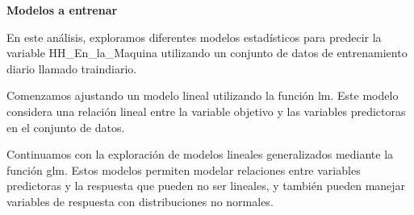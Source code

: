\documentclass[
  11pt,
  bookmarksnumbered]{article}
\begin{document}
\begin{table}[H]

\caption{\label{tab:unnamed-chunk-23}Base de Datos de prueba diario}
\centering
{}
\end{table}

\textbf{Modelos a entrenar}

En este análisis, exploramos diferentes modelos estadísticos para predecir la variable HH\_En\_la\_Maquina utilizando un conjunto de datos de entrenamiento diario llamado traindiario.

Comenzamos ajustando un modelo lineal utilizando la función lm.
Este modelo considera una relación lineal entre la variable objetivo y las variables predictoras en el conjunto de datos.

Continuamos con la exploración de modelos lineales generalizados mediante la función glm.
Estos modelos permiten modelar relaciones entre variables predictoras y la respuesta que pueden no ser lineales, y también pueden manejar variables de respuesta con distribuciones no normales.
\end{document}
